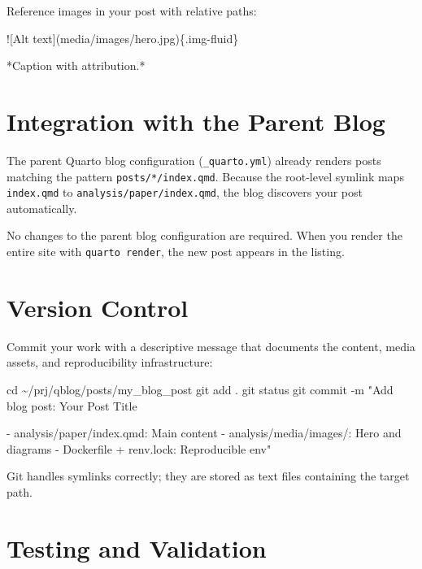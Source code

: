 \documentclass[
  letterpaper,
  DIV=11,
  numbers=noendperiod]{scrartcl}
\newenvironment{Shaded}{\begin{snugshade}}{\end{snugshade}}
\newcommand{\AttributeTok}[1]{\textcolor[rgb]{0.40,0.45,0.13}{#1}}
\newcommand{\BuiltInTok}[1]{\textcolor[rgb]{0.00,0.23,0.31}{#1}}
\newcommand{\FunctionTok}[1]{\textcolor[rgb]{0.28,0.35,0.67}{#1}}
\newcommand{\NormalTok}[1]{\textcolor[rgb]{0.00,0.23,0.31}{#1}}
\newcommand{\StringTok}[1]{\textcolor[rgb]{0.13,0.47,0.30}{#1}}
\begin{document}
Reference images in your post with relative paths:

\begin{Shaded}
\begin{Highlighting}[]
\NormalTok{![Alt text](media/images/hero.jpg)\{.img{-}fluid\}}

\NormalTok{*Caption with attribution.*}
\end{Highlighting}
\end{Shaded}

\section{Integration with the Parent
Blog}\label{integration-with-the-parent-blog}

The parent Quarto blog configuration (\texttt{\_quarto.yml}) already
renders posts matching the pattern \texttt{posts/*/index.qmd}. Because
the root-level symlink maps \texttt{index.qmd} to
\texttt{analysis/paper/index.qmd}, the blog discovers your post
automatically.

No changes to the parent blog configuration are required. When you
render the entire site with \texttt{quarto\ render}, the new post
appears in the listing.

\section{Version Control}\label{version-control}

Commit your work with a descriptive message that documents the content,
media assets, and reproducibility infrastructure:

\begin{Shaded}
\begin{Highlighting}[]
\BuiltInTok{cd}\NormalTok{ \textasciitilde{}/prj/qblog/posts/my\_blog\_post}
\FunctionTok{git}\NormalTok{ add .}
\FunctionTok{git}\NormalTok{ status}
\FunctionTok{git}\NormalTok{ commit }\AttributeTok{{-}m} \StringTok{"Add blog post: Your Post Title}

\StringTok{{-} analysis/paper/index.qmd: Main content}
\StringTok{{-} analysis/media/images/: Hero and diagrams}
\StringTok{{-} Dockerfile + renv.lock: Reproducible env"}
\end{Highlighting}
\end{Shaded}

Git handles symlinks correctly; they are stored as text files containing
the target path.

\section{Testing and Validation}\label{testing-and-validation}
\end{document}
